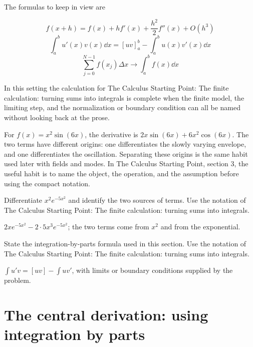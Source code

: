 The formulas to keep in view are

\[
  f(x+h)=f(x)+hf'(x)+\frac{h^2}{2}f''(x)+O(h^3)
\]
\[
  \int_a^b u'(x)v(x)\dd x=[uv]_a^b-\int_a^b u(x)v'(x)\dd x
\]
\[
  \sum_{j=0}^{N-1}f(x_j)\Delta x\longrightarrow \int_a^b f(x)\dd x
\]

In this setting the calculation for The Calculus Starting Point: The finite calculation: turning sums into integrals is complete when the finite model, the limiting step, and the normalization or boundary condition can all be named without looking back at the prose.




\begin{example}
For \(f(x)=x^2\sin(6x)\), the derivative is \(2x\sin(6x)+6x^2\cos(6x)\).  The two terms have different origins: one differentiates the slowly varying envelope, and one differentiates the oscillation.  Separating these origins is the same habit used later with fields and modes.  In The Calculus Starting Point, section 3, the useful habit is to name the object, the operation, and the assumption before using the compact notation.
\end{example}



\begin{exercise}
Differentiate \(x^2e^{-5x^2}\) and identify the two sources of terms.  Use the notation of The Calculus Starting Point: The finite calculation: turning sums into integrals.
\begin{answer}
\(2xe^{-5x^2}-2\cdot 5x^3e^{-5x^2}\); the two terms come from \(x^2\) and from the exponential.
\end{answer}
\end{exercise}

\begin{exercise}
State the integration-by-parts formula used in this section.  Use the notation of The Calculus Starting Point: The finite calculation: turning sums into integrals.
\begin{answer}
\(\int u'v=[uv]-\int uv'\), with limits or boundary conditions supplied by the problem.
\end{answer}
\end{exercise}



\section{The central derivation: using integration by parts}

